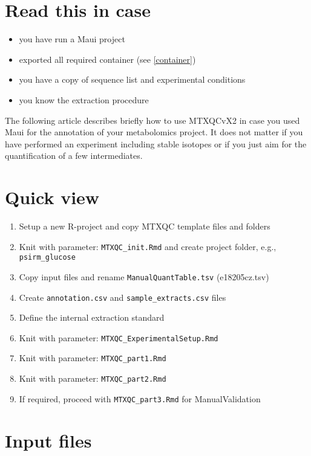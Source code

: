 \documentclass[]{book}
\providecommand{\tightlist}{%
  \setlength{\itemsep}{0pt}\setlength{\parskip}{0pt}}
\theoremstyle{definition}
\theoremstyle{definition}
\theoremstyle{definition}
\theoremstyle{remark}
\begin{document}
\section{Read this in case}\label{read-this-in-case}

\begin{itemize}
\tightlist
\item
  you have run a Maui project
\item
  exported all required container (see \ref{container})
\item
  you have a copy of sequence list and experimental conditions
\item
  you know the extraction procedure
\end{itemize}

The following article describes briefly how to use MTXQCvX2 in case you
used Maui for the annotation of your metabolomics project. It does not
matter if you have performed an experiment including stable isotopes or
if you just aim for the quantification of a few intermediates.

\section{Quick view}\label{quick-view}

\begin{enumerate}
\def\labelenumi{\arabic{enumi}.}
\tightlist
\item
  Setup a new R-project and copy MTXQC template files and folders
\item
  Knit with parameter: \texttt{MTXQC\_init.Rmd} and create project
  folder, e.g., \texttt{psirm\_glucose}
\item
  Copy input files and rename \texttt{ManualQuantTable.tsv}
  (e18205cz.tsv)
\item
  Create \texttt{annotation.csv} and \texttt{sample\_extracts.csv} files
\item
  Define the internal extraction standard
\item
  Knit with parameter: \texttt{MTXQC\_ExperimentalSetup.Rmd}
\item
  Knit with parameter: \texttt{MTXQC\_part1.Rmd}
\item
  Knit with parameter: \texttt{MTXQC\_part2.Rmd}
\item
  If required, proceed with \texttt{MTXQC\_part3.Rmd} for
  ManualValidation
\end{enumerate}

\section{Input files}\label{input-files}
\end{document}
